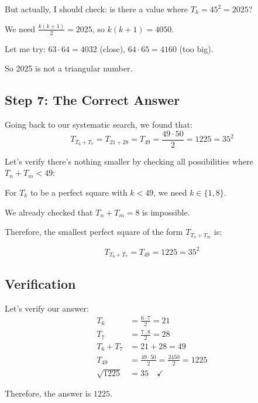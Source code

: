 \documentclass[12pt]{article}
\begin{document}
But actually, I should check: is there a value where $T_k = 45^2 = 2025$?

We need $\frac{k(k+1)}{2} = 2025$, so $k(k+1) = 4050$.

Let me try: $63 \cdot 64 = 4032$ (close), $64 \cdot 65 = 4160$ (too big).

So 2025 is not a triangular number.

\subsection*{Step 7: The Correct Answer}

Going back to our systematic search, we found that:
\begin{equation}
T_{T_6 + T_7} = T_{21 + 28} = T_{49} = \frac{49 \cdot 50}{2} = 1225 = 35^2
\end{equation}

Let's verify there's nothing smaller by checking all possibilities where $T_n + T_m < 49$:

For $T_k$ to be a perfect square with $k < 49$, we need $k \in \{1, 8\}$.

We already checked that $T_n + T_m = 8$ is impossible.

Therefore, the smallest perfect square of the form $T_{T_n + T_m}$ is:

\begin{equation}
\boxed{T_{T_6 + T_7} = T_{49} = 1225 = 35^2}
\end{equation}

\subsection*{Verification}

Let's verify our answer:
\begin{align*}
T_6 &= \frac{6 \cdot 7}{2} = 21 \\
T_7 &= \frac{7 \cdot 8}{2} = 28 \\
T_6 + T_7 &= 21 + 28 = 49 \\
T_{49} &= \frac{49 \cdot 50}{2} = \frac{2450}{2} = 1225 \\
\sqrt{1225} &= 35 \quad \checkmark
\end{align*}

Therefore, the answer is $\boxed{1225}$.
\end{document}
